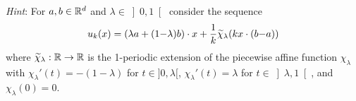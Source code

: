 \documentclass[12pt,a4paper]{article}
\begin{document}
\emph{Hint}: For $a,b\in{\mathbb R}^d$ and $\lambda\in\left]0,1\right[$ 
consider the sequence 
\[u_k(x) = (\lambda a + (1{-}\lambda) b)\cdot x+\frac{1}{k} \widetilde\chi_\lambda (kx\cdot(b{-}a))\] 
where $\widetilde\chi_\lambda:{\mathbb R}\to {\mathbb R}$ 
is the 1-periodic extension of the piecewise affine function $\chi_\lambda$ with
$\chi_\lambda'(t) = -(1{-}\lambda)$ for $t\in]0,\lambda[$, $\chi_\lambda'(t) = \lambda$ for $t\in\left]\lambda,1\right[$, and $\chi_\lambda(0)=0$.






\end{document}
